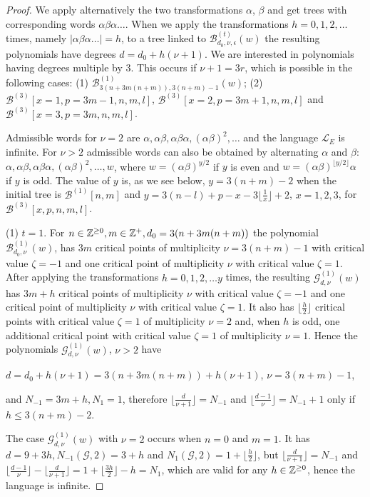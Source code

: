 \documentclass{birkjour_t2}
\theoremstyle{definition}
\theoremstyle{remark}
\numberwithin{equation}{section}
\begin{document}
 \begin{proof}
      \bigskip\par
     We apply alternatively the two transformations $\alpha$, $\beta$ and get trees with corresponding words $\alpha\beta\alpha \dots$. When we apply the transformations $h=0,1,2, \dots$ times, namely  $|\alpha\beta\alpha \dots|=h$, to a tree linked to ${\mathcal{B}}^{(t)}_{d_{0},\nu,\epsilon}(w)$ the resulting polynomials have degrees  $d=d_{0}+h(\nu+1)$.  We are interested in polynomials having degrees multiple by 3. This occurs if $\nu+1=3r$, which is possible in the following cases: (1) ${\mathcal{B}}^{(1)}_{3(n+3m(n+m)), 3(n+m)-1}(w)$; (2) ${\mathcal{B}}^{(3)}[x=1, p=3m-1, n, m, l]$, ${\mathcal{B}}^{(3)}[x=2, p=3m+1, n, m, l]$ and  ${\mathcal{B}}^{(3)}[x=3, p=3m, n, m, l]$.
\par  
 Admissible words for $\nu=2$ are $\alpha, \alpha\beta, \alpha\beta\alpha,  (\alpha\beta)^2, \dots $ and the language $\mathcal{L}_{E}$  is infinite.
For $\nu>2$ admissible words  can also be obtained by alternating $\alpha$ and $\beta$: $\alpha, \alpha\beta, \alpha\beta\alpha,  (\alpha\beta)^2, \dots  , w$, where 
 $w=(\alpha\beta)^{y/2}$ if  $y$ is even and  $w=(\alpha\beta)^{\lfloor y/2 \rfloor }\alpha$ if $y$ is odd. The value of $y$ is, as we see below,  $y=3(n+m)-2$ when the initial tree is ${\mathcal{B}}^{(1)}[n, m]$ and $y= 3(n-l)+p-x-3\lfloor \frac{1}{x}\rfloor+2$, $x=1, 2, 3$, for ${\mathcal{B}}^{(3)}[x, p, n, m, l]$.  
\bigskip\par\noindent
   (1) $t=1$. For  $n\in {\Bbb{Z}}^{\geq 0},  m\in {\Bbb{Z}}^{+}, d_{0}=3(n+3m(n+m))$ the polynomial ${\mathcal{B}}^{(1)}_{d_{0},\nu}(w)$, has $3m$ critical points of multiplicity $\nu=3(n+m)-1$ with critical value $\zeta=-1$ and one critical point of multiplicity $\nu$ with critical value $\zeta=1$. After applying the transformations $h=0,1,2, \dots y$ times, the resulting ${\mathcal{G}}^{(1)}_{d,\nu}(w)$  has $3m+h$ critical points of multiplicity $\nu$ with critical value $\zeta=-1$ and one critical point of multiplicity $\nu$ with critical value $\zeta=1$. It also has  $\lfloor \frac{h}{2} \rfloor$  critical points with critical value $\zeta=1$ of multiplicity $\nu=2$ and, when $h$ is odd, one additional critical point with critical value $\zeta=1$ of multiplicity $\nu=1$. Hence  the polynomials ${\mathcal{G}}^{(1)}_{d,\nu}(w)$, $\nu>2$ have 
\bigskip\par
$d=d_{0}+h(\nu+1)=3(n+3m(n+m))+h(\nu+1)$, $\nu=3(n+m)-1$, 
\bigskip\par\noindent
and $N_{-1}=3m+h, N_{1}=1$, therefore  $\lfloor \frac{d}{\nu+1}\rfloor=N_{-1}$ and  $\lfloor \frac{d-1}{\nu}\rfloor=N_{-1}+1$ only if $h \le 3(n+m)-2$. 
\par
The case ${\mathcal{G}}^{(1)}_{d,\nu}(w)$ with $\nu=2$ occurs when $n=0$ and $m=1$. It has $d=9+3h, N_{-1}(\mathcal{G}, 2)=3+h$ and $N_{1}(\mathcal{G}, 2)=1+\lfloor\frac{h}{2}\rfloor$, but $\lfloor \frac{d}{\nu+1}\rfloor=N_{-1}$ and $\lfloor \frac{d-1}{\nu}\rfloor-\lfloor \frac{d}{\nu+1}\rfloor=1+\lfloor\frac{3h}{2}\rfloor-h=N_{1}$, which are valid for any $h\in {\Bbb{Z}}^{\geq 0}$, hence the language is infinite.


\end{proof}
\end{document}
